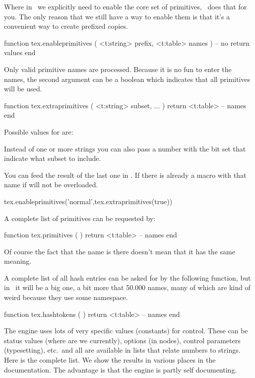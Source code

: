 \stopsubsection

\startsubsection[title={Primitives}]

Where in \LUATEX\ we explicitly need to enable the core set of primitives,
\LUAMETATEX\ does that for you. The only reason that we still have a way
to enable them is that it's a convenient way to create prefixed copies.

\starttyping[option=LUA]
function tex.enableprimitives (
    <t:string> prefix,
    <t:table>  names
)
    -- no return values
end
\stoptyping

Only valid primitive names are processed. Because it is no fun to enter the
names, the second argument can be a boolean which indicates that all primitives
will be used.

\starttyping[option=LUA]
function tex.extraprimitives ( <t:string> subset, ... )
    return <t:table> -- names
end
\stoptyping

Possible values for  are:


Instead of one or more strings you can also pass a number with the bit set that
indicate what subset to include.

You can feed the result of the last one in . If
there is already a macro with that name if will not be overloaded.

\starttyping[option=LUA]
tex.enableprimitives('normal',tex.extraprimitives(true))
\stoptyping

A complete list of primitives can be requested by:

\starttyping[option=LUA]
function tex.primitives ( )
    return <t:table> -- names
end
\stoptyping

Of course the fact that the name is there doesn't mean that it has the same
meaning.

A complete list of all hash entries can be asked for by the following function, but
in \CONTEXT\ it will be a big one, a bit more that 50.000 names, many of which are
kind of weird because they use some namespace.

\starttyping[option=LUA]
function tex.hashtokens ( )
    return <t:table> -- names
end
\stoptyping

\stopsubsection

\startsubsection[title=Values (constants)]

The engine uses lots of very specific values (constants) for control. These can
be status values (where are we currently), options (in nodes), control parameters
(typesetting), etc.\ and all are available in lists that relate numbers to
strings. Here is the complete list. We show the results in various places in the
documentation. The advantage is that the engine is partly self documenting.

